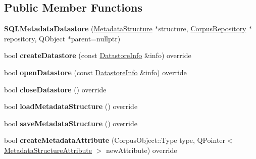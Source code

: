 \subsection*{Public Member Functions}
\begin{DoxyCompactItemize}
\item 
\mbox{\label{class_s_q_l_metadata_datastore_a98762cb74c5586c23de2d2c82dfab7ca}} 
{\bfseries S\+Q\+L\+Metadata\+Datastore} (\hyperlink{class_metadata_structure}{Metadata\+Structure} $\ast$structure, \hyperlink{class_corpus_repository}{Corpus\+Repository} $\ast$repository, Q\+Object $\ast$parent=nullptr)
\item 
\mbox{\label{class_s_q_l_metadata_datastore_af31b988f00912f8cbc68212b893e3120}} 
bool {\bfseries create\+Datastore} (const \hyperlink{class_datastore_info}{Datastore\+Info} \&info) override
\item 
\mbox{\label{class_s_q_l_metadata_datastore_ab7c7d3f10adc85d60ddcdc38fe44c823}} 
bool {\bfseries open\+Datastore} (const \hyperlink{class_datastore_info}{Datastore\+Info} \&info) override
\item 
\mbox{\label{class_s_q_l_metadata_datastore_a7ec33a1870fb35ba52da353c31268a21}} 
bool {\bfseries close\+Datastore} () override
\item 
\mbox{\label{class_s_q_l_metadata_datastore_aaf9cd9961f58f50b891d136d466fb5a8}} 
bool {\bfseries load\+Metadata\+Structure} () override
\item 
\mbox{\label{class_s_q_l_metadata_datastore_a77987bce3e823b07b716da8164600ca7}} 
bool {\bfseries save\+Metadata\+Structure} () override
\item 
\mbox{\label{class_s_q_l_metadata_datastore_a795e6a9bf1b436c5e40c13e9f36e4c47}} 
bool {\bfseries create\+Metadata\+Attribute} (Corpus\+Object\+::\+Type type, Q\+Pointer$<$ \hyperlink{class_metadata_structure_attribute}{Metadata\+Structure\+Attribute} $>$ new\+Attribute) override
\item 
\mbox{\label{class_s_q_l_metadata_datastore_af5ead6b31c33aa3f67b3c54cfcc834b1}} 

\end{DoxyCompactItemize}
